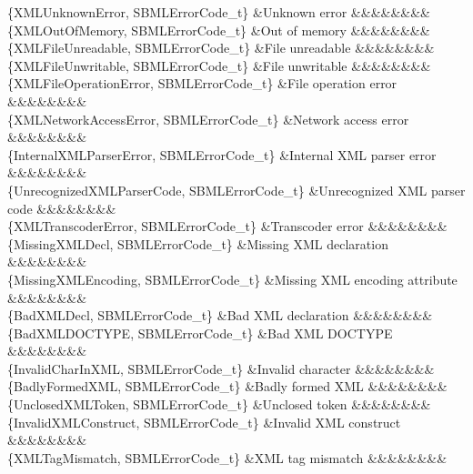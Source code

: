 \begin{DoxyParagraph}{}
\begin{longtabu}
\endhead
\{X\+M\+L\+Unknown\+Error, S\+B\+M\+L\+Error\+Code\+\_\+t\} &Unknown error &&&&&&&&\\
\{X\+M\+L\+Out\+Of\+Memory, S\+B\+M\+L\+Error\+Code\+\_\+t\} &Out of memory &&&&&&&&\\
\{X\+M\+L\+File\+Unreadable, S\+B\+M\+L\+Error\+Code\+\_\+t\} &File unreadable &&&&&&&&\\
\{X\+M\+L\+File\+Unwritable, S\+B\+M\+L\+Error\+Code\+\_\+t\} &File unwritable &&&&&&&&\\
\{X\+M\+L\+File\+Operation\+Error, S\+B\+M\+L\+Error\+Code\+\_\+t\} &File operation error &&&&&&&&\\
\{X\+M\+L\+Network\+Access\+Error, S\+B\+M\+L\+Error\+Code\+\_\+t\} &Network access error &&&&&&&&\\
\{Internal\+X\+M\+L\+Parser\+Error, S\+B\+M\+L\+Error\+Code\+\_\+t\} &Internal X\+ML parser error &&&&&&&&\\
\{Unrecognized\+X\+M\+L\+Parser\+Code, S\+B\+M\+L\+Error\+Code\+\_\+t\} &Unrecognized X\+ML parser code &&&&&&&&\\
\{X\+M\+L\+Transcoder\+Error, S\+B\+M\+L\+Error\+Code\+\_\+t\} &Transcoder error &&&&&&&&\\
\{Missing\+X\+M\+L\+Decl, S\+B\+M\+L\+Error\+Code\+\_\+t\} &Missing X\+ML declaration &&&&&&&&\\
\{Missing\+X\+M\+L\+Encoding, S\+B\+M\+L\+Error\+Code\+\_\+t\} &Missing X\+ML encoding attribute &&&&&&&&\\
\{Bad\+X\+M\+L\+Decl, S\+B\+M\+L\+Error\+Code\+\_\+t\} &Bad X\+ML declaration &&&&&&&&\\
\{Bad\+X\+M\+L\+D\+O\+C\+T\+Y\+PE, S\+B\+M\+L\+Error\+Code\+\_\+t\} &Bad X\+ML D\+O\+C\+T\+Y\+PE &&&&&&&&\\
\{Invalid\+Char\+In\+X\+ML, S\+B\+M\+L\+Error\+Code\+\_\+t\} &Invalid character &&&&&&&&\\
\{Badly\+Formed\+X\+ML, S\+B\+M\+L\+Error\+Code\+\_\+t\} &Badly formed X\+ML &&&&&&&&\\
\{Unclosed\+X\+M\+L\+Token, S\+B\+M\+L\+Error\+Code\+\_\+t\} &Unclosed token &&&&&&&&\\
\{Invalid\+X\+M\+L\+Construct, S\+B\+M\+L\+Error\+Code\+\_\+t\} &Invalid X\+ML construct &&&&&&&&\\
\{X\+M\+L\+Tag\+Mismatch, S\+B\+M\+L\+Error\+Code\+\_\+t\} &X\+ML tag mismatch &&&&&&&&\\

\end{longtabu}
\end{DoxyParagraph}
